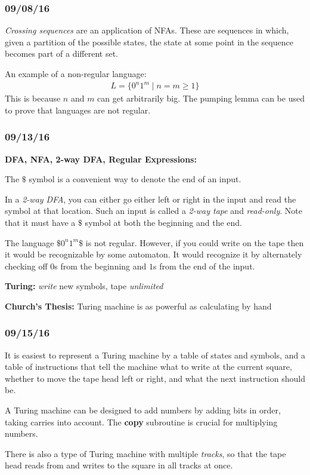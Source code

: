 \documentclass[a4paper,12pt]{article}
\theoremstyle{remark}
\theoremstyle{definition}
\begin{document}
\subsubsection*{09/08/16}
\emph{Crossing sequences} are an application of NFAs. These are sequences in which, given a partition of the possible states, the state at some point in the sequence becomes part of a different set. \par
An example of a non-regular language:
\begin{align*}
    L = \{ 0^n 1^m \mid n = m \geq 1 \}
\end{align*}
This is because $n$ and $m$ can get arbitrarily big. The pumping lemma can be used to prove that languages are not regular.

\subsubsection*{09/13/16}
\textbf{DFA, NFA, 2-way DFA, Regular Expressions:} \par
The $\$$ symbol is a convenient way to denote the end of an input. \par
In a \emph{2-way DFA}, you can either go either left or right in the input and read the symbol at that location. Such an input is called a \emph{2-way tape} and \emph{read-only}. Note that it must have a $\$$ symbol at both the beginning and the end. \par
The language $\$0^n 1^m\$$ is not regular. However, if you could write on the tape then it would be recognizable by some automaton. It would recognize it by alternately checking off $0$s from the beginning and $1$s from the end of the input. \par
\textbf{Turing:} \emph{write} new symbols, tape \emph{unlimited} \par
\textbf{Church's Thesis:} Turing machine is as powerful as calculating by hand

\subsubsection*{09/15/16}
It is easiest to represent a Turing machine by a table of states and symbols, and a table of instructions that tell the machine what to write at the current square, whether to move the tape head left or right, and what the next instruction should be. \par
A Turing machine can be designed to add numbers by adding bits in order, taking carries into account. The \textbf{copy} subroutine is crucial for multiplying numbers. \par
There is also a type of Turing machine with multiple \emph{tracks}, so that the tape head reads from and writes to the square in all tracks at once.
\end{document}
